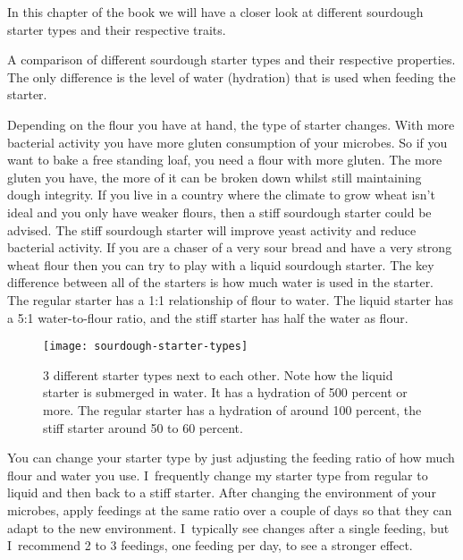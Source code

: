 In this chapter of the book we will have a closer look
at different sourdough starter types and their respective
traits.

\begin{table}[htp!]
    \begin{center}
        
        \caption{A comparison of different sourdough starter types and their
            respective properties. The only difference is the level of water (hydration)
        that is used when feeding the starter.}%
        \label{tab:starter-types-comparison}
    \end{center}
\end{table}

Depending on the flour you have at hand, the type of starter changes. With more
bacterial activity you have more gluten consumption of your microbes. So if
you want to bake a free standing loaf, you need a flour with more gluten. The
more gluten you have, the more of it can be broken down whilst still maintaining
dough integrity. If you live in a country where the climate to grow wheat
isn't ideal and you only have weaker flours, then a stiff sourdough starter
could be advised. The stiff sourdough starter will improve yeast activity and
reduce bacterial activity. If you are a chaser of a very sour bread and have a
very strong wheat flour then you can try to play with a liquid sourdough
starter. The key difference between all of the starters is how much water
is used in the starter. The regular starter has a 1:1 relationship of flour
to water. The liquid starter has a 5:1 water-to-flour ratio, and the stiff
starter has half the water as flour.

\begin{figure}[!htb]
  \texttt{[image: sourdough-starter-types]}
  \caption{3 different starter types next to each other. Note how the liquid starter is submerged
  in water. It has a hydration of 500 percent or more.
  The regular starter has a hydration of around 100 percent, the stiff starter
around 50 to 60 percent.}%
  \label{fig:starter-types}
\end{figure}


You can change your starter type by just adjusting the feeding ratio of how
much flour and water you use. I~frequently change my starter type from
regular to liquid and then back to a stiff starter. After changing the
environment of your microbes, apply feedings at the same ratio over a couple of
days so that they can adapt to the new environment. I~typically see
changes after a single feeding, but I~recommend 2 to 3 feedings, one feeding per
day, to see a stronger effect.


